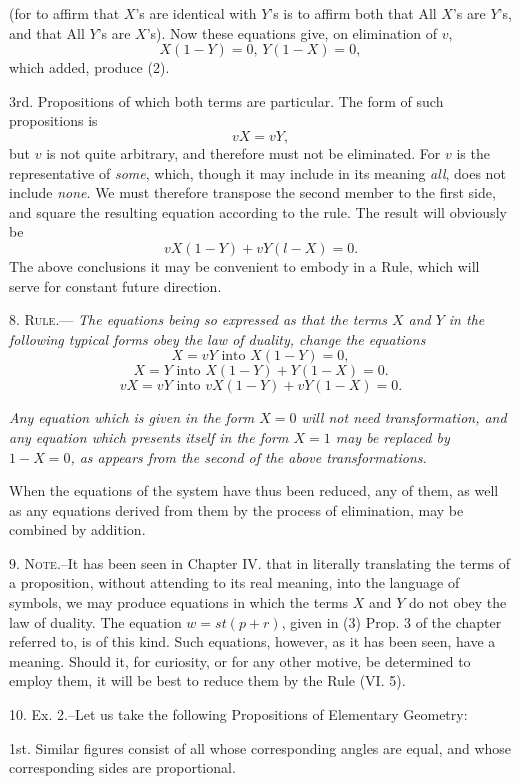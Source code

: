 \documentclass[oneside]{book}
\begin{document}
(for to affirm that $X$'s are identical with $Y$'s is to affirm both that
All $X$'s are $Y$'s, and that All $Y$'s are $X$'s). Now these equations
give, on elimination of $v$,
\[
X(1-Y)=0\textrm{, } Y(1-X)=0,
\]
which added, produce (2).

3rd. Propositions of which both terms are particular. The
form of such propositions is
\[
vX = vY,
\]
but $v$ is not quite arbitrary, and therefore must not be eliminated.
For $v$ is the representative of \textit{some}, which, though it may include
in its meaning \textit{all}, does not include \textit{none}. We must therefore
transpose the second member to the first side, and square the
resulting equation according to the rule.
The result will obviously be
\[
vX(1 - Y) + vY(l-X) = 0.
\]
The above conclusions it may be convenient to embody in a
Rule, which will serve for constant future direction.

8. \textsc{Rule}.--- \textit{The equations being so expressed as that the terms $X$
and $Y$ in the following typical forms obey the law of duality, change
the equations}
\[
X = vY \textrm{ into } X(1- Y) = 0,
\]
\[
X = Y \textrm{ into } X(1 - Y) + Y(1 - X) = 0.
\]
\[
vX= vY \textrm{ into } vX(1-Y) + vY(1 - X) = 0.
\]

\textit{Any equation which is given in the form $X = 0$ will not need transformation,
and any equation which presents itself in the form $X = 1$
may be replaced by $1 - X = 0$, as appears from the second of the
above transformations.}

When the equations of the system have thus been reduced,
any of them, as well as any equations derived from them by the
process of elimination, may be combined by addition.

9. \textsc{Note}.--It has been seen in Chapter IV. that in literally
translating the terms of a proposition, without attending to its
real meaning, into the language of symbols, we may produce
equations in which the terms $X$ and $Y$ do not obey the law of
duality. The equation $w = st(p + r)$, given in (3) Prop. 3 of
the chapter referred to, is of this kind. Such equations, however,
as it has been seen, have a meaning. Should it, for curiosity,
or for any other motive, be determined to employ them,
it will be best to reduce them by the Rule (VI. 5).

10. Ex. 2.--Let us take the following Propositions of Elementary
Geometry:

1st. Similar figures consist of all whose corresponding angles
are equal, and whose corresponding sides are proportional.
\end{document}
